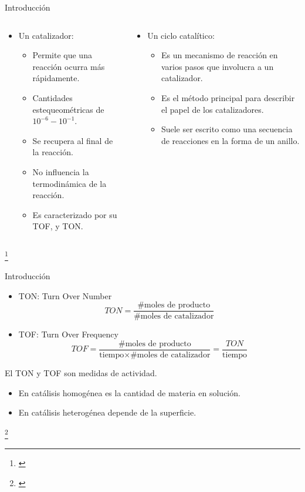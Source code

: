 \documentclass[handout]{beamer}
\newcommand\blfootnote[1]
{%
	\begingroup
	\renewcommand\thefootnote{}\footnote{#1}%
	\addtocounter{footnote}{-1}%
	\endgroup
}
\newcommand{\fcite}[1]{\blfootnote{\cite{#1}}}
\newcommand{\kw}[1]{{\color{blue}#1}}
\begin{document}
\begin{frame}{Introducci\'on}
	\begin{columns}
		\begin{column}{0.5\textwidth}
			\begin{itemize}
				\item \color{blue} Un catalizador:
				\begin{itemize}
					\item Permite que una reacci\'on ocurra m\'as r\'apidamente.
					\item Cantidades estequeom\'etricas de $10^{-6}-10^{-1}$.
					\item Se recupera al final de la reacci\'on.
					\item No influencia la termodin\'amica de la reacci\'on.
					\item Es caracterizado por su \kw{TOF}, y \kw{TON}.
				\end{itemize}
			\end{itemize}
		\end{column}
		\begin{column}{0.6\textwidth}
			\begin{itemize}
				\item \color{blue} Un ciclo catal\'itico:
				\begin{itemize}
					\item Es un mecanismo de reacción en varios pasos que involucra a un catalizador.
					\item Es el método principal para describir el papel de los catalizadores.
					\item Suele ser escrito como una secuencia de reacciones en la forma de un anillo.
				\end{itemize}
			\end{itemize}
		\end{column}
	\end{columns}
	\fcite{astruc2007organometallic}
\end{frame}

\begin{frame}{Introducci\'on}
	\begin{itemize}
		\item \kw{TON:} Turn Over Number
		\begin{equation}
			TON = \dfrac{\text{\# moles de producto}}{\text{\# moles de catalizador}}
		\end{equation}
		\item \kw{TOF:} Turn Over Frequency
		\begin{equation}
			TOF = \dfrac{\text{\# moles de producto}}{\text{tiempo}\times\text{\# moles de catalizador}} = \dfrac{TON}{\text{tiempo}}
		\end{equation}
	\end{itemize}
	El \kw{TON} y \kw{TOF} son medidas de actividad.
	\begin{itemize}
		\footnotesize
		\item En catálisis homogénea es la
		cantidad de materia en solución.
		\item En catálisis heterogénea depende de la superficie.
	\end{itemize}
	\fcite{astruc2007organometallic}
\end{frame}
\end{document}
